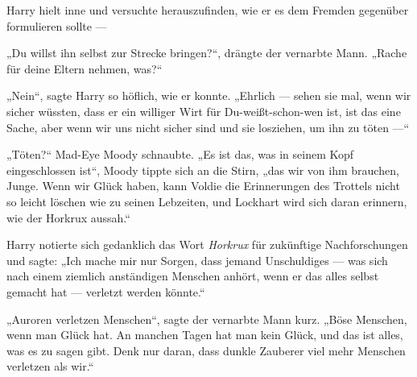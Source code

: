 Harry hielt inne und versuchte herauszufinden, wie er es dem Fremden gegenüber formulieren sollte —

„Du willst ihn selbst zur Strecke bringen?“, drängte der vernarbte Mann.
„Rache für deine Eltern nehmen, was?“

„Nein“, sagte Harry so höflich, wie er konnte.
„Ehrlich — sehen sie mal, wenn wir sicher wüssten, dass er ein williger Wirt für Du-weißt-schon-wen ist, ist das eine Sache, aber wenn wir uns nicht sicher sind und sie losziehen, um ihn zu töten —“

„Töten?“ Mad-Eye Moody schnaubte.
„Es ist das, was in seinem Kopf eingeschlossen ist“, Moody tippte sich an die Stirn, „das wir von ihm brauchen, Junge. Wenn wir Glück haben, kann Voldie die Erinnerungen des Trottels nicht so leicht löschen wie zu seinen Lebzeiten, und Lockhart wird sich daran erinnern, wie der Horkrux aussah.“

Harry notierte sich gedanklich das Wort \emph{Horkrux} für zukünftige Nachforschungen und sagte:
„Ich mache mir nur Sorgen, dass jemand Unschuldiges — was sich nach einem ziemlich anständigen Menschen anhört, wenn er das alles selbst gemacht hat — verletzt werden könnte.“

„Auroren verletzen Menschen“, sagte der vernarbte Mann kurz.
„Böse Menschen, wenn man Glück hat. An manchen Tagen hat man kein Glück, und das ist alles, was es zu sagen gibt. Denk nur daran, dass dunkle Zauberer viel mehr Menschen verletzen als wir.“

